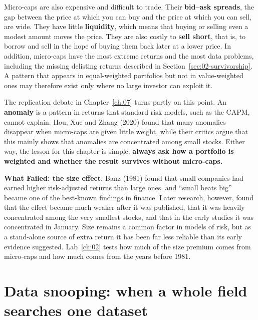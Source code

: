 Micro-caps are also expensive and difficult to trade. Their \textbf{bid--ask spreads}, the gap between the price at which you can buy and the price at which you can sell, are wide. They have little \textbf{liquidity}, which means that buying or selling even a modest amount moves the price. They are also costly to \textbf{sell short}, that is, to borrow and sell in the hope of buying them back later at a lower price. In addition, micro-caps have the most extreme returns and the most data problems, including the missing delisting returns described in Section~\ref{sec:02-survivorship}. A pattern that appears in equal-weighted portfolios but not in value-weighted ones may therefore exist only where no large investor can exploit it.

The replication debate in Chapter~\ref{ch:07} turns partly on this point. An \textbf{anomaly} is a pattern in returns that standard risk models, such as the CAPM, cannot explain. Hou, Xue and Zhang (2020) found that many anomalies disappear when micro-caps are given little weight, while their critics argue that this mainly shows that anomalies are concentrated among small stocks. Either way, the lesson for this chapter is simple: \textbf{always ask how a portfolio is weighted and whether the result survives without micro-caps.}

\begin{callout}
\textbf{What Failed: the size effect.} Banz (1981) found that small companies had earned higher risk-adjusted returns than large ones, and ``small beats big'' became one of the best-known findings in finance. Later research, however, found that the effect became much weaker after it was published, that it was heavily concentrated among the very smallest stocks, and that in the early studies it was concentrated in January. Size remains a common factor in models of risk, but as a stand-alone source of extra return it has been far less reliable than its early evidence suggested. Lab~\ref{ch:02} tests how much of the size premium comes from micro-caps and how much comes from the years before 1981.
\end{callout}

\section{Data snooping: when a whole field searches one dataset}
\label{sec:02-snooping}

